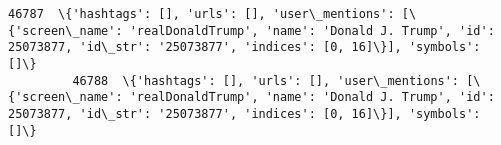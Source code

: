 \documentclass[11pt]{article}
\begin{document}
\begin{Verbatim}[commandchars=\\\{\}]
         46787  \{'hashtags': [], 'urls': [], 'user\_mentions': [\{'screen\_name': 'realDonaldTrump', 'name': 'Donald J. Trump', 'id': 25073877, 'id\_str': '25073877', 'indices': [0, 16]\}], 'symbols': []\}                                                                                                                                                                                                                                                                                                                                                                                                                                                                                                                                                                                                                                                                                                                                                                                                                                                                                                                                                                                                                        
         46788  \{'hashtags': [], 'urls': [], 'user\_mentions': [\{'screen\_name': 'realDonaldTrump', 'name': 'Donald J. Trump', 'id': 25073877, 'id\_str': '25073877', 'indices': [0, 16]\}], 'symbols': []\}                                                                                                                                                                                                                                                                                                                                                                                                                                                                                                                                                                                                                                                                                                                                                                                                                                                                                                                                                                                                                        

\end{Verbatim}
\end{document}
